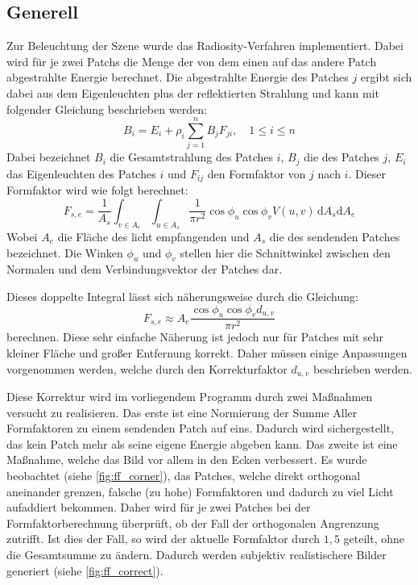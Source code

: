 \documentclass[final,a4paper,11pt,notitlepage,halfparskip]{scrreprt}
\begin{document}
\subsection{Generell}
Zur Beleuchtung der Szene wurde das Radiosity-Verfahren implementiert.  Dabei 
wird für je zwei Patchs die Menge der von dem einen auf das
andere Patch abgestrahlte Energie berechnet. Die abgestrahlte Energie des
Patches $j$ ergibt sich dabei aus dem Eigenleuchten plus der reflektierten 
Strahlung und kann mit folgender Gleichung beschrieben werden:
$$B_i = E_i + \rho_i \sum_{j=1}^n B_jF_{ji},\quad 1 \le i \le n$$
Dabei bezeichnet $B_i$ die Gesamtstrahlung des Patches $i$, $B_j$ die des
Patches $j$, $E_i$ das Eigenleuchten des Patches $i$ und $F_{ij}$ den Formfaktor
von $j$ nach $i$. Dieser Formfaktor wird wie folgt berechnet:
$$F_{s,e} = \frac{1}{A_s}\int_{v\in A_e}\int_{u\in A_s} \frac{1}{\pi r^2} 
\cos\phi_u\cos\phi_v V(u,v) \,\mathrm dA_s \mathrm dA_e$$
Wobei $A_{e}$ die Fläche des licht empfangenden und $A_s$ die des sendenden
Patches bezeichnet. Die Winken $\phi_u$ und $\phi_v$ stellen hier die
Schnittwinkel zwischen den Normalen und dem Verbindungsvektor der Patches dar.

Dieses doppelte Integral lässt sich näherungsweise durch die Gleichung:
$$F_{s,e} \approx A_e \frac{\cos\phi_u\cos\phi_v d_{u,v}}{\pi r^2}$$
berechnen. Diese sehr einfache Näherung ist jedoch nur für Patches mit sehr
kleiner Fläche und großer Entfernung korrekt. Daher müssen einige Anpassungen
vorgenommen werden, welche durch den Korrekturfaktor $d_{u,v}$ beschrieben
werden.

Diese Korrektur wird im vorliegendem Programm durch zwei Maßnahmen versucht zu
realisieren. Das erste ist eine Normierung der Summe Aller Formfaktoren zu einem
sendenden Patch auf eins. Dadurch wird sichergestellt, das kein Patch mehr als
seine eigene Energie abgeben kann. Das zweite ist eine Maßnahme, welche das Bild
vor allem in den Ecken verbessert. Es wurde beobachtet (siehe \ref{fig:ff_corner}), 
das Patches, welche direkt orthogonal aneinander grenzen, falsche (zu hohe) 
Formfaktoren und dadurch zu viel Licht aufaddiert bekommen. Daher wird für je
zwei Patches bei der Formfaktorberechnung überprüft, ob der Fall der
orthogonalen Angrenzung zutrifft. Ist dies der Fall, so wird der aktuelle
Formfaktor durch $1,5$ geteilt, ohne die Gesamtsumme zu ändern. Dadurch werden
subjektiv realistischere Bilder generiert (siehe \ref{fig:ff_correct}). 
\end{document}
